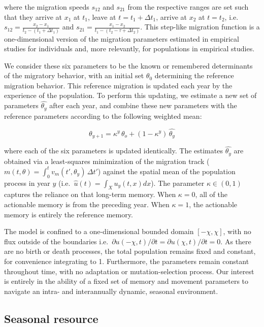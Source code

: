 \documentclass[utf8]{frontiersSCNS} %
\begin{document}
\noindent where the migration speeds $s_{12}$ and $s_{21}$ from the respective ranges are set such that they arrive at $x_1$ at $t_1$, leave at $t = t_1 + \Delta t_1$, arrive at $x_2$ at $t = t_2$, i.e.~$s_{12} = \frac{x_2-x_1}{t_2 - (t_1 + \Delta t_1)}$ and $s_{21} = \frac{x_1-x_2}{t_1 - (t_2 - \tau + \Delta t_2)}$. This step-like migration function is a one-dimensional version of the migration parameters estimated in empirical studies for individuals \citep{Gurarie2017} and, more relevantly, for populations \citep{Gurarie2019} in empirical studies.

We consider these six parameters to be the known or remembered determinants of the migratory behavior, with an initial set $\theta_0$ determining the reference migration behavior. This reference migration is updated each year by the experience of the population. To perform this updating, we estimate a new set of parameters $\widehat{\theta_y}$ after each year, and combine these new parameters with the reference parameters according to the following weighted mean:

$$\theta_{y+1} = \kappa^y \, \theta_o + \left(1-\kappa^y\right)\,\widehat{\theta_y}$$ 

\noindent where each of the six parameters is updated identically. The estimates $\widehat{\theta_y}$ are obtained via a least-squares minimization of the migration track ($m(t,\theta) = \int_0^t v_m(t',\theta_y) \, \Delta t'$) against the spatial mean of the population process in year $y$ (i.e.~$\widehat{u}(t) = \int_X u_y(t, x) dx$). The parameter $\kappa \in (0,1)$ captures the reliance on that long-term memory. When $\kappa = 0$, all of the actionable memory is from the preceding year. When $\kappa = 1$, the actionable memory is entirely the reference memory.

The model is confined to a one-dimensional bounded domain $[-\chi,\chi]$, with no flux outside of the boundaries i.e.~${\partial u(-\chi,t)}/{\partial t} = {\partial u(\chi,t)}/{\partial t} =0$. As there are no birth or death processes, the total population remains fixed and constant, for convenience integrating to 1. Furthermore, the parameters remain constant throughout time, with no adaptation or mutation-selection process. Our interest is entirely in the ability of a fixed set of memory and movement parameters to navigate an intra- and interannually dynamic, seasonal environment.

\subsection{Seasonal resource}
\end{document}
